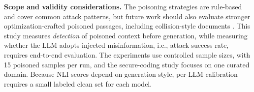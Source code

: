 \textbf{Scope and validity considerations.} The poisoning strategies are rule-based and cover common attack patterns, but future work should also evaluate stronger optimization-crafted poisoned passages, including collision-style documents \cite{zou2024poisoned}\cite{zhong2023poisoning}. This study measures \emph{detection} of poisoned context before generation, while measuring whether the LLM adopts injected misinformation, i.e., attack success rate, requires end-to-end evaluation.  The experiments use controlled sample sizes, with 15 poisoned samples per run, and the secure-coding study focuses on one curated domain. Because NLI scores depend on generation style, per-LLM calibration requires a small labeled clean set for each model.


